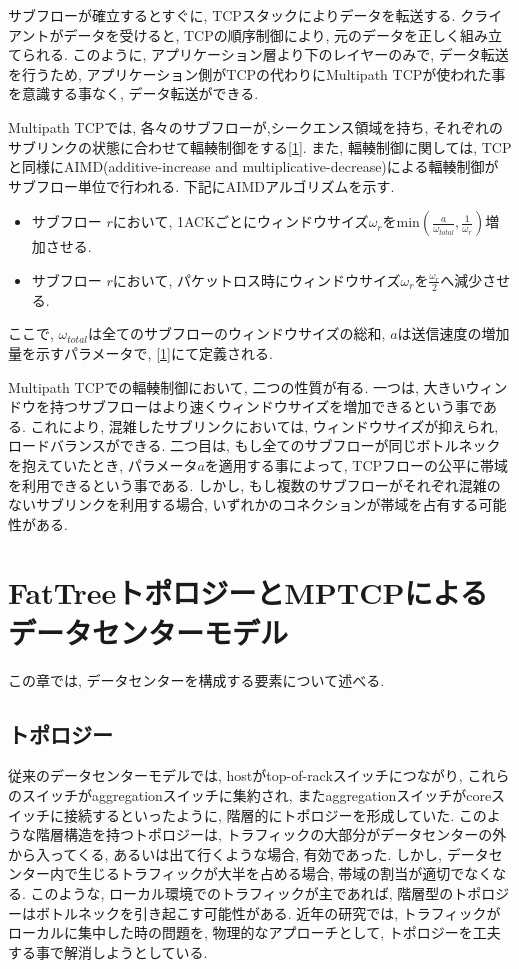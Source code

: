 \documentclass{ieicej}
\begin{document}
サブフローが確立するとすぐに, TCPスタックによりデータを転送する.
クライアントがデータを受けると, TCPの順序制御により, 元のデータを正しく組み立てられる.
このように, アプリケーション層より下のレイヤーのみで, データ転送を行うため, アプリケーション側がTCPの代わりにMultipath
TCPが使われた事を意識する事なく, データ転送ができる.

Multipath TCPでは, 各々のサブフローが,シークエンス領域を持ち, それぞれのサブリンクの状態に合わせて輻輳制御をする[\ref{}].
また, 輻輳制御に関しては, TCPと同様にAIMD(additive-increase and
multiplicative-decrease)による輻輳制御がサブフロー単位で行われる.
下記にAIMDアルゴリズムを示す.

\begin{itemize}
\item サブフロー $r$において,
1ACKごとにウィンドウサイズ$\omega_{r}$をmin$(\frac{a}{\omega_{total}},
\frac{1}{\omega_r})$増加させる.
\item サブフロー $r$において, パケットロス時にウィンドウサイズ$\omega_r$を$\frac{\omega_r}{2}$へ減少させる.
\end{itemize}
ここで, $\omega_{total}$は全てのサブフローのウィンドウサイズの総和, $a$は送信速度の増加量を示すパラメータで,
[\ref{}]にて定義される.

Multipath TCPでの輻輳制御において, 二つの性質が有る.
一つは, 大きいウィンドウを持つサブフローはより速くウィンドウサイズを増加できるという事である.
これにより, 混雑したサブリンクにおいては, ウィンドウサイズが抑えられ, ロードバランスができる.
二つ目は, もし全てのサブフローが同じボトルネックを抱えていたとき, パラメータ$a$を適用する事によって,
TCPフローの公平に帯域を利用できるという事である.
しかし, もし複数のサブフローがそれぞれ混雑のないサブリンクを利用する場合, いずれかのコネクションが帯域を占有する可能性がある.


\section{FatTreeトポロジーとMPTCPによるデータセンターモデル}
この章では, データセンターを構成する要素について述べる.
\subsection{トポロジー}
\label{subsec:topology}
従来のデータセンターモデルでは, hostがtop-of-rackスイッチにつながり,
これらのスイッチがaggregationスイッチに集約され,
またaggregationスイッチがcoreスイッチに接続するといったように, 階層的にトポロジーを形成していた.
このような階層構造を持つトポロジーは, トラフィックの大部分がデータセンターの外から入ってくる, あるいは出て行くような場合, 有効であった.
しかし, データセンター内で生じるトラフィックが大半を占める場合, 帯域の割当が適切でなくなる.
このような, ローカル環境でのトラフィックが主であれば, 階層型のトポロジーはボトルネックを引き起こす可能性がある.
近年の研究では, トラフィックがローカルに集中した時の問題を, 物理的なアプローチとして, トポロジーを工夫する事で解消しようとしている.
\end{document}
